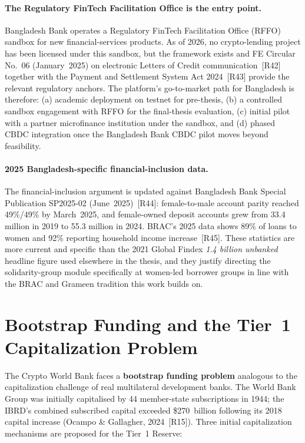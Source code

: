 \documentclass[12pt,a4paper]{report}
\begin{document}
\paragraph{The Regulatory FinTech Facilitation Office is the entry point.}
Bangladesh Bank operates a Regulatory FinTech Facilitation Office (RFFO) sandbox for new financial-services products. As of 2026, no crypto-lending project has been licensed under this sandbox, but the framework exists and FE Circular No.~06 (January~2025) on electronic Letters of Credit communication~[R42] together with the Payment and Settlement System Act 2024~[R43] provide the relevant regulatory anchors. The platform's go-to-market path for Bangladesh is therefore: (a) academic deployment on testnet for pre-thesis, (b) a controlled sandbox engagement with RFFO for the final-thesis evaluation, (c) initial pilot with a partner microfinance institution under the sandbox, and (d) phased CBDC integration once the Bangladesh Bank CBDC pilot moves beyond feasibility.

\paragraph{2025 Bangladesh-specific financial-inclusion data.}
The financial-inclusion argument is updated against Bangladesh Bank Special Publication SP2025-02 (June~2025)~[R44]: female-to-male account parity reached 49\%/49\% by March~2025, and female-owned deposit accounts grew from 33.4 million in 2019 to 55.3 million in 2024. BRAC's 2025 data shows 89\% of loans to women and 92\% reporting household income increase~[R45]. These statistics are more current and specific than the 2021 Global Findex \emph{1.4 billion unbanked} headline figure used elsewhere in the thesis, and they justify directing the solidarity-group module specifically at women-led borrower groups in line with the BRAC and Grameen tradition this work builds on.

\section{Bootstrap Funding and the Tier~1 Capitalization Problem}

The Crypto World Bank faces a \textbf{bootstrap funding problem} analogous to the capitalization challenge of real multilateral development banks. The World Bank Group was initially capitalised by 44 member-state subscriptions in 1944; the IBRD's combined subscribed capital exceeded \$270~billion following its 2018 capital increase (Ocampo \& Gallagher, 2024~[R15]). Three initial capitalization mechanisms are proposed for the Tier~1 Reserve:
\end{document}
